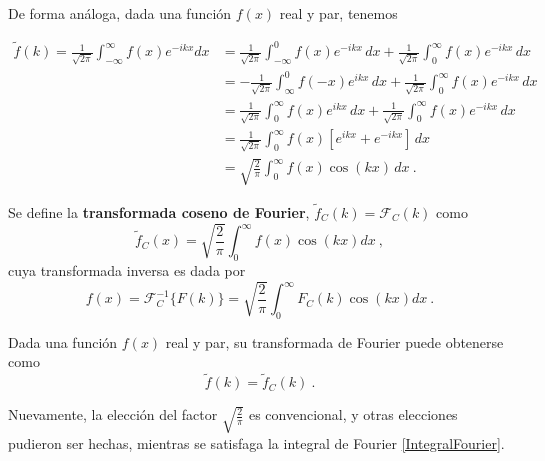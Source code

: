 De forma análoga, dada una función $f(x)$ real y par, tenemos

\begin{align*}
    \tilde{f}(k) = \frac{1}{\sqrt{2\pi}} \int_{-\infty}^{\infty} f(x) e^{-ikx} dx 
    & = \frac{1}{\sqrt{2\pi}} \int_{-\infty}^0 f(x) e^{-ikx} \,dx + \frac{1}{\sqrt{2\pi}} \int_{0}^{\infty} f(x) e^{-ikx} \, dx  \\
    & = -\frac{1}{\sqrt{2\pi}} \int_{\infty}^0 f(-x) e^{ikx} \,dx + \frac{1}{\sqrt{2\pi}} \int_{0}^{\infty} f(x) e^{-ikx} \, dx \\
    & = \frac{1}{\sqrt{2\pi}} \int_{0}^{\infty} f(x) e^{ikx} \,dx + \frac{1}{\sqrt{2\pi}} \int_{0}^{\infty} f(x) e^{-ikx} \, dx \\
    & = \frac{1}{\sqrt{2\pi}} \int_{0}^{\infty} f(x) [e^{ikx} + e^{-ikx}  ] \,dx \\
    & = \sqrt{\frac{2}{\pi}} \int_{0}^{\infty} f(x) \cos(kx) \,dx \ .
\end{align*}

\begin{defi}
    Se define la \textbf{transformada coseno de Fourier}, $\tilde{f}_C(k) = \mathcal{F}_C(k)$ como
    \begin{equation}
        \tilde{f}_C(x) = \sqrt{\frac{2}{\pi}} \int_0^\infty f(x) \cos(kx) dx \ ,
    \end{equation}
    cuya transformada inversa es dada por
    \begin{equation}
        f(x) = \mathcal{F}^{-1}_C\{F(k)\} = \sqrt{\frac{2}{\pi}} \int_0^\infty F_C(k) \cos(kx) dx \ .
    \end{equation}

    Dada una función $f(x)$ real y par, su transformada de Fourier puede obtenerse como
    \begin{equation*}
        \tilde{f}(k) = \tilde{f}_C(k) \ .
    \end{equation*}
\end{defi}

Nuevamente, la elección del factor $\sqrt{\frac{2}{\pi}}$ es convencional, y otras elecciones pudieron ser hechas, mientras se satisfaga la integral de Fourier \eqref{IntegralFourier}.

     
